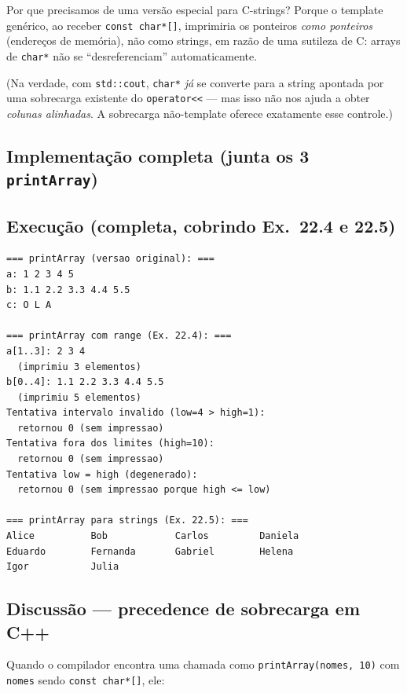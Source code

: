 \documentclass[11pt,a4paper]{article}
\begin{document}
Por que precisamos de uma vers\~ao especial para C-strings? Porque o template gen\'erico, ao receber \texttt{const char*[]}, imprimiria os ponteiros \emph{como ponteiros} (endere\c{c}os de mem\'oria), n\~ao como strings, em raz\~ao de uma sutileza de C: arrays de \texttt{char*} n\~ao se ``desreferenciam'' automaticamente.

(Na verdade, com \texttt{std::cout}, \texttt{char*} \emph{j\'a} se converte para a string apontada por uma sobrecarga existente do \texttt{operator<<} --- mas isso n\~ao nos ajuda a obter \emph{colunas alinhadas}. A sobrecarga n\~ao-template oferece exatamente esse controle.)

\subsection*{Implementa\c{c}\~ao completa (junta os 3 \texttt{printArray})}



\subsection*{Execu\c{c}\~ao (completa, cobrindo Ex.~22.4 e 22.5)}

\begin{saidabox}
\begin{lstlisting}[style=terminal]
=== printArray (versao original): ===
a: 1 2 3 4 5
b: 1.1 2.2 3.3 4.4 5.5
c: O L A

=== printArray com range (Ex. 22.4): ===
a[1..3]: 2 3 4
  (imprimiu 3 elementos)
b[0..4]: 1.1 2.2 3.3 4.4 5.5
  (imprimiu 5 elementos)
Tentativa intervalo invalido (low=4 > high=1):
  retornou 0 (sem impressao)
Tentativa fora dos limites (high=10):
  retornou 0 (sem impressao)
Tentativa low = high (degenerado):
  retornou 0 (sem impressao porque high <= low)

=== printArray para strings (Ex. 22.5): ===
Alice          Bob            Carlos         Daniela
Eduardo        Fernanda       Gabriel        Helena
Igor           Julia
\end{lstlisting}
\end{saidabox}\normalcolor

\subsection*{Discuss\~ao --- precedence de sobrecarga em C++}

Quando o compilador encontra uma chamada como \texttt{printArray(nomes, 10)} com \texttt{nomes} sendo \texttt{const char*[]}, ele:
\end{document}
